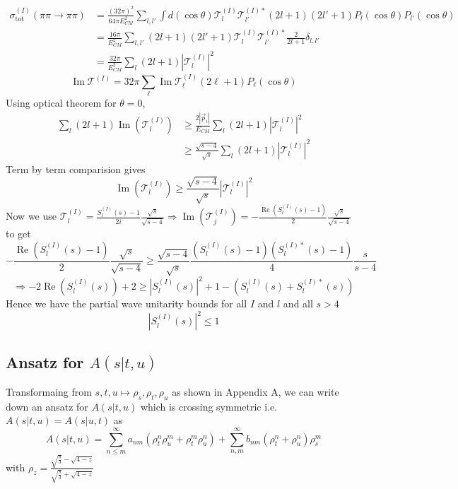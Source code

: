﻿\documentclass[12pt,a4paper]{article}
\begin{document}
$$\begin{aligned} \sigma^{(I)}_{\text {tot }}(\pi \pi \rightarrow \pi \pi) &=\frac{(32 \pi)^{2}}{64 \pi E_{C M}^{2}} \sum_{l,l'} \int d (\cos \theta) \mathcal{T}^{(I)}_{l} \mathcal{T}_{l'}^{(I)*}(2 l+1)(2 l'+1) P_{l}(\cos \theta) P_{l'}(\cos \theta) \\
 &=\frac{16 \pi}{E_{C M}^{2}}  \sum_{l,l'}(2 l+1)(2 l'+1) \mathcal{T}^{(I)}_{l} \mathcal{T}_{l'}^{(I)*} \frac{2}{2 l+1} \delta_{l,l'} \\ 
&=\frac{32 \pi}{E_{C M}^{2}} \sum_{l}(2 l+1)\left|\mathcal{T}^{(I)}_{l}\right|^{2} \end{aligned}$$
$$\operatorname{Im}\mathcal{T}^{(I)}=32 \pi \sum_{\ell} \operatorname{Im}\mathcal{T}^{(I)}_{\ell}(2 \ell+1) P_{\ell}(\cos \theta)$$
Using optical theorem for $\theta=0$,
$$\begin{aligned} \sum_{l}(2 l+1) \operatorname{Im}\left(\mathcal{T}^{(I)}_{l}\right) & \geq \frac{2\left|\vec{p}_{i}\right|}{E_{C M}} \sum_{l}(2 l+1)\left|\mathcal{T}^{(I)}_{l}\right|^{2} \\ & \geq \frac{\sqrt{s-4}}{\sqrt{s}} \sum_{l}(2 l+1)\left|\mathcal{T}^{(I)}_{l}\right|^{2} \end{aligned}$$
Term by term comparision gives
$$\operatorname{Im}\left(\mathcal{T}^{(I)}_{l}\right) \geq \frac{\sqrt{s-4}}{\sqrt{s}} \left|\mathcal{T}^{(I)}_{l}\right|^{2} $$
Now we use $\mathcal{T}_{l}^{(I)}=\frac{S_{l}^{(I)}(s)-1}{2 i} \frac{\sqrt{s}}{\sqrt{s-4}}\Rightarrow \operatorname{Im}\left(\mathcal{T}^{(I)}_{j}\right)=-\frac{\operatorname{Re}\left(S^{(I)}_{l}(s)-1\right)}{2} \frac{\sqrt{s}}{\sqrt{s-4}}$ to get
$$-\frac{\operatorname{Re}\left(S^{(I)}_{l}(s)-1\right)}{2} \frac{\sqrt{s}}{\sqrt{s-4}} \geq \frac{\sqrt{s-4}}{\sqrt{s}} \frac{\left(S^{(I)}_{l}(s)-1\right)(S^{(I)*}_{l}(s)-1)}{4} \frac{s}{s-4}$$
$$\Rightarrow-2 \operatorname{Re}\left(S^{(I)}_{l}(s)\right)+2 \geq\left|S^{(I)}_{l}(s)\right|^{2}+1-\left(S^{(I)}_{l}(s)+S^{(I)*}_{l}(s)\right)$$
Hence we have the partial wave unitarity bounds for all $I$ and $l$ and all $s>4$
$$\left|S^{(I)}_{l}(s)\right|^{2} \leq 1$$
\subsection{Ansatz for $A(s|t,u)$}
Transformaing from $s,t,u \mapsto \rho_{s},\rho_{t},\rho_{u}$ as shown in Appendix A, we can write down an ansatz for $A(s|t,u)$ which is crossing symmetric i.e. $A(s|t,u)=A(s|u,t)$ as
$$
A(s | t, u)=\sum_{n \leq m}^{\infty} a_{n m}\left(\rho_{t}^{n} \rho_{u}^{m}+\rho_{t}^{m} \rho_{u}^{n}\right)+\sum_{n, m}^{\infty} b_{n m}\left(\rho_{t}^{n}+\rho_{u}^{n}\right) \rho_{s}^{m}
$$
with $\rho_{z} = \frac{\sqrt{\frac{8}{3}}-\sqrt{4-z}}{\sqrt{\frac{8}{3}}+\sqrt{4-z}}$\\\\
\end{document}
